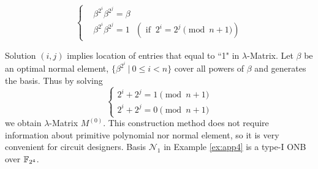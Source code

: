 $$
\begin{cases}
&\beta^{2^i}\beta^{2^j} = \beta\\
&\beta^{2^i}\beta^{2^j} = 1 ~~~(\text{ if }~  2^i = 2^j\pmod{n+1})
\end{cases}$$

Solution $(i,j)$ implies location of entries that equal to ``1" in $\lambda$-Matrix. 
Let $\beta$ be an optimal normal element, 
$\{\beta^{2^i}~|~0\leq i<n\}$ cover all powers of $\beta$ and generates the basis. Thus by solving
$$\begin{cases}
2^i + 2^j = 1 \pmod{n+1}\\
2^i + 2^j = 0 \pmod{n+1}
\end{cases}$$
we obtain $\lambda$-Matrix $M^{(0)}$. This construction method does not require information about 
primitive polynomial nor normal element, so it is very convenient for circuit designers.
Basis $\mathcal N_1$ in Example \ref{ex:app4} is a type-I ONB over ${\mathbb{F}}_{2^4}$.

